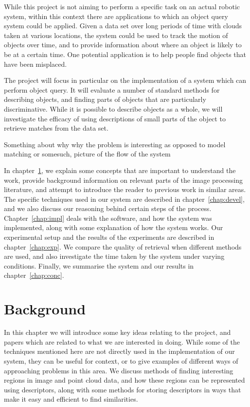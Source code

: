 \documentclass[11pt,a4paper]{kth-mag}
\begin{document}
While this project is not aiming to perform a specific task on an actual robotic
system, within this context there are applications to which an object query
system could be applied. Given a data set over long periods of time with clouds
taken at various locations, the system could be used to track the motion of
objects over time, and to provide information about where an object is likely to
be at a certain time. One potential application is to help people find objects
that have been misplaced.

The project will focus in particular on the implementation of a system which can
perform object query. It will evaluate a number of standard methods for
describing objects, and finding parts of objects that are particularly
discriminative. While it is possible to describe objects as a whole, we will
investigate the efficacy of using descriptions of small parts of the object to
retrieve matches from the data set.

Something about why why the problem is interesting as opposed to model matching
or somesuch, picture of the flow of the system

In chapter~\ref{chap:bg}, we explain some concepts that are important to
understand the work, provide background information on relevant parts of the
image processing literature, and attempt to introduce the reader to previous
work in similar areas. The specific techniques used in our system are described
in chapter~\ref{chap:devel}, and we also discuss our reasoning behind certain
steps of the process. Chapter~\ref{chap:impl} deals with the software, and how
the system was implemented, along with some explanation of how the system works.
Our experimental setup and the results of the experiments are described in
chapter~\ref{chap:exp}. We compare the quality of retrieval when different
methods are used, and also investigate the time taken by the system under
varying conditions. Finally, we summarise the system and our results in
chapter~\ref{chap:conc}.
\chapter{Background}
\label{chap:bg}
In this chapter we will introduce some key ideas relating to the project, and
papers which are related to what we are interested in doing. While some of the
techniques mentioned here are not directly used in the implementation of our
system, they can be useful for context, or to give examples of different ways of
approaching problems in this area. We discuss methods of finding interesting
regions in image and point cloud data, and how these regions can be represented
using descriptors, along with some methods for storing descriptors in ways that
make it easy and efficient to find similarities.
\end{document}
